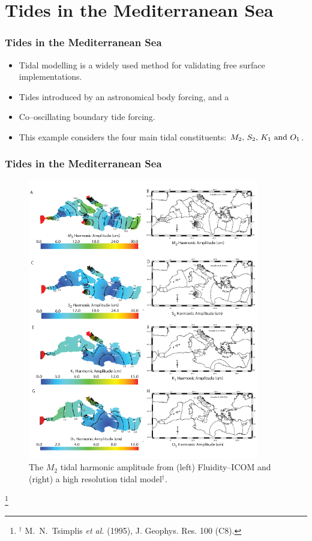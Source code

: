 \section{Tides in the Mediterranean Sea}

\begin{frame}
    \frametitle{Tides in the Mediterranean Sea}
\begin{itemize}
\item Tidal modelling is a widely used method for validating free surface implementations.
\item Tides introduced by an astronomical body forcing, and a
\item Co--oscillating boundary tide forcing.
\item This example considers the four main tidal constituents: \mbox{$M_2, \, S_2, \, K_1 \,\, {\rm and} \,\, O_1$}.
\end{itemize}
\end{frame}
%
\begin{frame}
    \frametitle{Tides in the Mediterranean Sea}
\begin{figure}
\centering
\includegraphics[width=0.9\textwidth, clip = True, trim = 5mm 180mm 0mm 0mm]{./tides_in_the_Mediterranean_Sea/amp.png}
\caption{The $M_2$ tidal harmonic amplitude from (left) Fluidity--ICOM and (right) a high resolution tidal model${}^\dagger$.}
\end{figure}
\footnote{${}^\dagger$ M.~N.~Tsimplis {\it et al.} (1995), J. Geophys. Res. 100 (C8).}
\end{frame}
%

